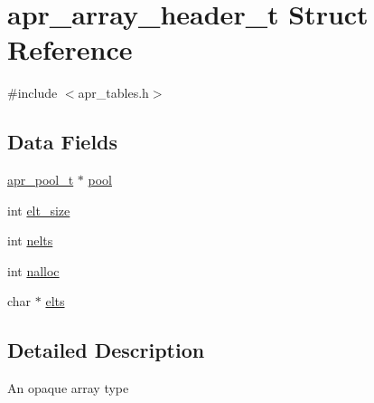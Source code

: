 \hypertarget{structapr__array__header__t}{\section{apr\-\_\-array\-\_\-header\-\_\-t Struct Reference}
\label{structapr__array__header__t}
}


{\ttfamily \#include $<$apr\-\_\-tables.\-h$>$}

\subsection*{Data Fields}
\begin{DoxyCompactItemize}
\item 
\hyperlink{group__apr__pools_gaf137f28edcf9a086cd6bc36c20d7cdfb}{apr\-\_\-pool\-\_\-t} $\ast$ \hyperlink{structapr__array__header__t_a68f353ce65943172fcc9494aa9f6e424}{pool}
\item 
int \hyperlink{structapr__array__header__t_a36a690ebc781edc9e99ac1bec53c1770}{elt\-\_\-size}
\item 
int \hyperlink{structapr__array__header__t_ab11b88220885c5a0920a06ac85680055}{nelts}
\item 
int \hyperlink{structapr__array__header__t_a0ceb78a23ebef1bceea5f0cd3e1513b6}{nalloc}
\item 
char $\ast$ \hyperlink{structapr__array__header__t_af8462fa2a1ddf6406c66cd3dd441a269}{elts}
\end{DoxyCompactItemize}


\subsection{Detailed Description}
An opaque array type 

